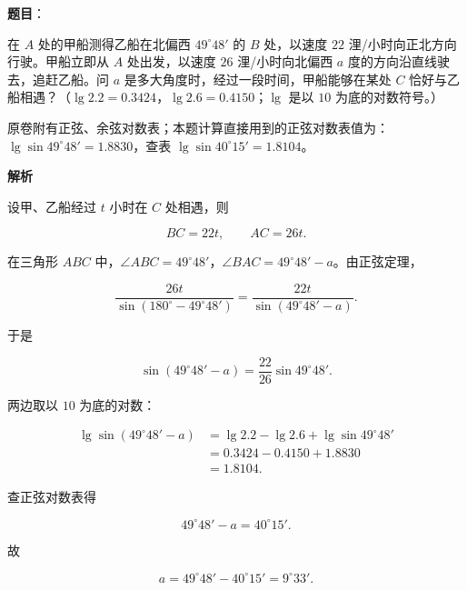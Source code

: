 \begin{answer}

\textbf{题目}：

在 $A$ 处的甲船测得乙船在北偏西 $49^\circ48'$ 的 $B$ 处，以速度 $22$ 浬/小时向正北方向行驶。甲船立即从 $A$ 处出发，以速度 $26$ 浬/小时向北偏西 $a$ 度的方向沿直线驶去，追赶乙船。问 $a$ 是多大角度时，经过一段时间，甲船能够在某处 $C$ 恰好与乙船相遇？（$\lg2.2=0.3424$，$\lg2.6=0.4150$；$\lg$ 是以 $10$ 为底的对数符号。）
\nopagebreak[4]
\begin{center}\end{center}
\nopagebreak[4]
\begin{gktip}
原卷附有正弦、余弦对数表；本题计算直接用到的正弦对数表值为：$\lg\sin49^\circ48'=1.8830$，查表 $\lg\sin40^\circ15'=1.8104$。
\end{gktip}

\textbf{解析}

设甲、乙船经过 $t$ 小时在 $C$ 处相遇，则

\nopagebreak[4]
\[BC=22t,\qquad AC=26t.\]

在三角形 $ABC$ 中，$\angle ABC=49^\circ48'$，$\angle BAC=49^\circ48'-a$。由正弦定理，

\nopagebreak[4]
\[\frac{26t}{\sin(180^\circ-49^\circ48')}=\frac{22t}{\sin(49^\circ48'-a)}.\]

于是

\nopagebreak[4]
\[\sin(49^\circ48'-a)=\frac{22}{26}\sin49^\circ48'.\]

两边取以 $10$ 为底的对数：

\nopagebreak[4]
\[\begin{aligned}
\lg\sin(49^\circ48'-a)
&=\lg2.2-\lg2.6+\lg\sin49^\circ48'\\
&=0.3424-0.4150+1.8830\\
&=1.8104.
\end{aligned}\]

查正弦对数表得

\nopagebreak[4]
\[49^\circ48'-a=40^\circ15'.\]

故

\nopagebreak[4]
\[a=49^\circ48'-40^\circ15'=9^\circ33'.\]


\end{answer}
